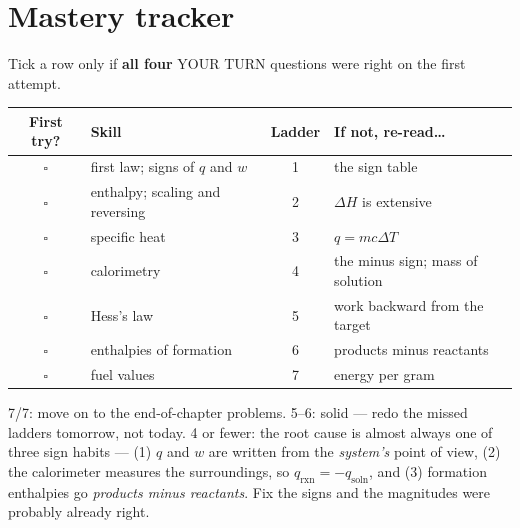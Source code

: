 \documentclass{apchem-worksheet}
\begin{document}
\section*{\sffamily Mastery tracker}

Tick a row only if \textbf{all four} YOUR TURN questions were right on
the first attempt.

\renewcommand{\arraystretch}{1.35}
\noindent\begin{tabular}{@{}c p{6.4cm} c p{4.6cm}@{}}
\toprule
\textbf{First try?} & \textbf{Skill} & \textbf{Ladder} &
  \textbf{If not, re-read\ldots}\\
\midrule
$\square$ & first law; signs of $q$ and $w$ & 1 & the sign table \\
$\square$ & enthalpy; scaling and reversing & 2 & $\Delta H$ is
  extensive \\
$\square$ & specific heat & 3 & $q = mc\Delta T$ \\
$\square$ & calorimetry & 4 & the minus sign; mass of solution \\
$\square$ & Hess's law & 5 & work backward from the target \\
$\square$ & enthalpies of formation & 6 & products minus reactants \\
$\square$ & fuel values & 7 & energy per gram \\
\bottomrule
\end{tabular}

\begin{apcnote}
7/7: move on to the end-of-chapter problems. 5--6: solid --- redo the
missed ladders tomorrow, not today. 4 or fewer: the root cause is almost
always one of three sign habits --- (1) $q$ and $w$ are written from the
\emph{system's} point of view, (2) the calorimeter measures the
surroundings, so $q_{\text{rxn}} = -q_{\text{soln}}$, and
(3) formation enthalpies go \emph{products minus reactants}. Fix the
signs and the magnitudes were probably already right.
\end{apcnote}
\end{document}
